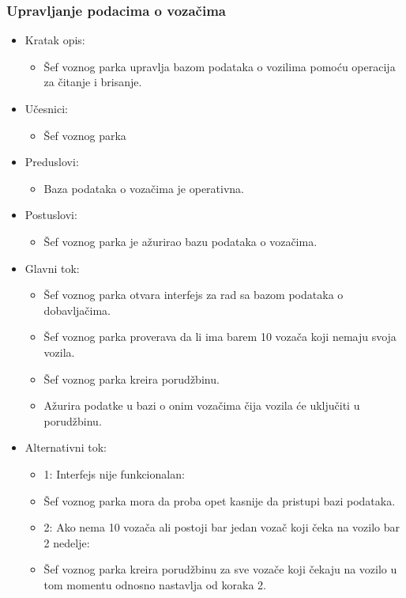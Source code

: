 \subsubsection{\bfseries Upravljanje podacima o vozačima}

\begin{itemize}
	\item Kratak opis:
		\begin{itemize}
			\item Šef voznog parka upravlja bazom podataka o vozilima pomoću operacija za čitanje i brisanje.
		\end{itemize}

	\item Učesnici:
		\begin{itemize}
		    \item Šef voznog parka
		\end{itemize}


	\item Preduslovi:
		\begin{itemize}
		    \item Baza podataka o vozačima je operativna.
		\end{itemize}


	\item Postuslovi:
		\begin{itemize}
			\item Šef voznog parka je ažurirao bazu podataka o vozačima.
	\end{itemize}

	\item Glavni tok:
		\begin{itemize}
		    \item Šef voznog parka otvara interfejs za rad sa bazom podataka o dobavljačima.
		    \item Šef voznog parka proverava da li ima barem 10 vozača koji nemaju svoja vozila.
		    \item Šef voznog parka kreira porudžbinu.
			\item Ažurira podatke u bazi o onim vozačima čija vozila će uključiti u porudžbinu.
		\end{itemize}

	\item Alternativni tok:
		\begin{itemize}
		    \item 1: Interfejs nije funkcionalan:
			\item Šef voznog parka mora da proba opet kasnije da pristupi bazi podataka.
			\item 2: Ako nema 10 vozača ali postoji bar jedan vozač koji čeka na vozilo bar 2 nedelje:
			\item Šef voznog parka kreira porudžbinu za sve vozače koji čekaju na vozilo u tom momentu odnosno nastavlja od koraka 2.
		\end{itemize}

\end{itemize}

